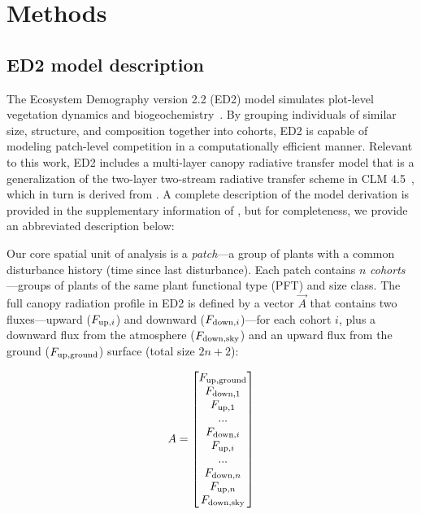 \section{Methods}

\subsection{ED2 model description}

The Ecosystem Demography version 2.2 (ED2) model simulates plot-level vegetation dynamics and biogeochemistry~\citep{moorcroft_2001_method, medvigy2009mechanistic, longo_2019_ed1}.
By grouping individuals of similar size, structure, and composition together into cohorts, ED2 is capable of modeling patch-level competition in a computationally efficient manner.
Relevant to this work, ED2 includes a multi-layer canopy radiative transfer model that is a generalization of the two-layer two-stream radiative transfer scheme in CLM 4.5~\citep{clm45_note}, which in turn is derived from \citet{sellers1985canopy}.
A complete description of the model derivation is provided in the supplementary information of \citet{longo_2019_ed1}, but for completeness, we provide an abbreviated description below:

Our core spatial unit of analysis is a \emph{patch}---a group of plants with a common disturbance history (time since last disturbance).
Each patch contains $n$ \emph{cohorts}---groups of plants of the same plant functional type (PFT) and size class.
The full canopy radiation profile in ED2 is defined by a vector $\vec{A}$ that contains two fluxes---upward ($\relax{F}_{\mathrm{up},i}$) and downward ($F_{\mathrm{down},i}$)---for each cohort $i$, plus a downward flux from the atmosphere ($F_{\mathrm{down},\mathrm{sky}}$) and an upward flux from the ground ($F_{\mathrm{up},\mathrm{ground}}$) surface (total size $2n + 2$):

\begin{equation}
  \relax{A} =
  \begin{bmatrix}
    F_{\mathrm{up},\mathrm{ground}} \\
    F_{\mathrm{down},1} \\
    F_{\mathrm{up}, 1} \\
    ... \\
    F_{\mathrm{down},i} \\
    F_{\mathrm{up},i} \\
    ... \\
    F_{\mathrm{down},n} \\
    F_{\mathrm{up},n} \\
    F_{\mathrm{down},\mathrm{sky}}
  \end{bmatrix}
\end{equation}

